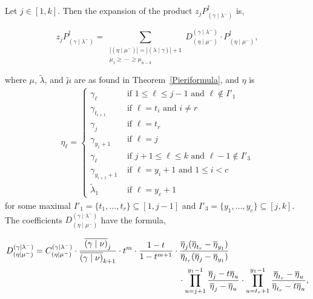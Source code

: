 \documentclass[ALCO]{cedram}
\newcommand{\PB}[1]{P_{#1}^\dagger}
\newcommand{\nudom}{{( \lambda \mid \gamma )}}
\newcommand{\lambdagamma}{{\nudom}}
\newcommand{\gammalambdamin}{{(\gamma \mid \lambda^-)}}
\newcommand{\gammanu}{{(\gamma \mid \nu)}}
\newcommand{\etamu}{{(\eta \mid \mu^-)}}
\newcommand{\mutilde}{{\widetilde{\mu}}}
\newcommand{\lambdatilde}{{\widetilde{\lambda}}}
\newcommand{\etamumin}{{(\eta \mid \mu^-)}}
\newcommand{\DBaratta}{D_{\etamumin}^\gammalambdamin}
\begin{document}
\begin{thm}\label{nonsymmetricformula} Let $j \in [1,k]$. Then the expansion of the product $z_j \PB{\gammalambdamin}$ is,

\begin{equation} \label{monomialexpansion} z_j \PB{\gammalambdamin} =\sum_{\substack{|\etamu| = |\lambdagamma| + 1 \\ \mu_1 \geq \, \dotsm \, \geq \mu_{n-k}}}  \DBaratta \cdot \PB{\etamumin}, \end{equation}

where $\mu$, $\lambdatilde$, and $\mutilde$ are as found in Theorem~\ref{Pieriformula}, and $\eta$ is
\begin{align}
    \eta_\ell = \begin{cases}
    \gamma_\ell  &\text{ if } 1\leq \ell\leq j-1 \text{ and } \ell \notin I'_1\\
    \gamma_{t_{i+1}} &\text{ if } \ell = t_i \text{ and } i\neq r\\
    \gamma_j &\text{ if } \ell = t_r\\
    \gamma_{y_1+1} &\text{ if } \ell = j\\
    \gamma_\ell &\text{ if } j+1 \leq \ell \leq k \text{ and } \ell-1 \notin I'_3\\
    \gamma_{y_{i+1}+1} &\text{ if } \ell=y_i+1 \text{ and } 1\leq i < c\\
    \lambdatilde_1 &\text{ if } \ell = y_c+1
    \end{cases}
\end{align}
for some maximal $I'_1 = \{t_1, \dotsc, t_r\} \subseteq [1,j-1]$ and $I'_3 = \{y_1, \dotsc, y_c\} \subseteq [j,k]$. The coefficients $\DBaratta$ have the formula,

\begin{align*} \DBaratta &= C_{\etamumin}^{\gammalambdamin} \cdot \frac{ \overline{\gammanu}_j}{ \overline{\gammanu}_{k+1}} \cdot t^m \cdot \frac{1-t}{1-t^{m+1}} \cdot  \frac{\overline{\eta}_j(\overline{\eta}_{t_r} - \overline{\eta}_{y_1})}{\overline{\eta}_{t_r}(\overline{\eta}_j-\overline{\eta}_{y_1})} \\ &\hspace*{6cm} \cdot \prod_{u=j+1}^{y_1-1} \frac{\overline{\eta}_j-t\overline{\eta}_u}{\overline{\eta}_j-\overline{\eta}_u} \cdot \prod_{u=t_r+1}^{y_1-1} \frac{\overline{\eta}_{t_r}-\overline{\eta}_u}{\overline{\eta}_{t_r}-t\overline{\eta}_u},\end{align*}



\end{thm}
\end{document}
